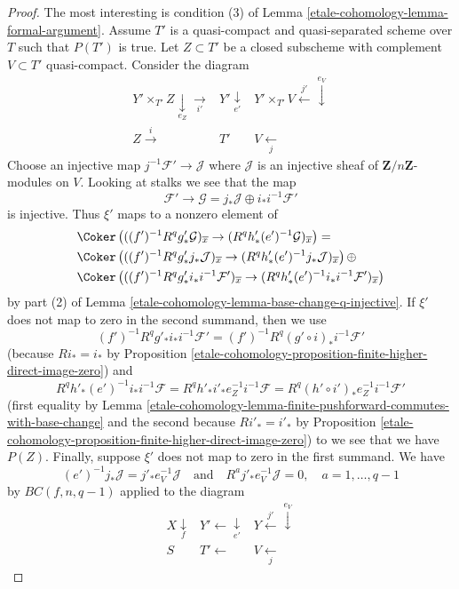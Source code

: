 \begin{proof}
\medskip\noindent
The most interesting is condition (3) of Lemma \ref{etale-cohomology-lemma-formal-argument}.
Assume $T'$ is a quasi-compact and quasi-separated scheme over $T$
such that $P(T')$ is true.
Let $Z \subset T'$ be a closed subscheme with complement $V \subset T'$
quasi-compact. Consider the diagram
$$
\begin{array}{ccc}Y' \times_{T'} Z \underset{e_Z}{\downarrow}\underset{i'}{\longrightarrow} & Y' \underset{e'}{\downarrow} & Y' \times_{T'} V \overset{j'}{\longleftarrow}\overset{e_V}{\downarrow} \\ Z \overset{i}{\longrightarrow} & T' & V \underset{j}{\longleftarrow}\end{array}
$$
Choose an injective map $j^{-1}\mathcal{F}' \to \mathcal{J}$
where $\mathcal{J}$ is an injective sheaf of $\mathbf{Z}/n\mathbf{Z}$-modules
on $V$. Looking at stalks we see that the map
$$
\mathcal{F}' \to \mathcal{G} = j_*\mathcal{J} \oplus i_*i^{-1}\mathcal{F}'
$$
is injective. Thus $\xi'$ maps to a nonzero element of
\begin{align*}
& \Coker\left(
((f')^{-1}R^qg'_*\mathcal{G})_{\overline{x}}
\to
(R^qh'_*(e')^{-1}\mathcal{G})_{\overline{x}}
\right) = \\
&
\Coker\left(
((f')^{-1}R^qg'_*j_*\mathcal{J})_{\overline{x}}
\to
(R^qh'_*(e')^{-1}j_*\mathcal{J})_{\overline{x}}
\right) \oplus \\
& \Coker\left(
((f')^{-1}R^qg'_*i_*i^{-1}\mathcal{F}')_{\overline{x}}
\to
(R^qh'_*(e')^{-1}i_*i^{-1}\mathcal{F}')_{\overline{x}}
\right)
\end{align*}
by part (2) of Lemma \ref{etale-cohomology-lemma-base-change-q-injective}.
If $\xi'$ does not map to zero in the second summand, then
we use
$$
(f')^{-1}R^qg'_*i_*i^{-1}\mathcal{F}' =
(f')^{-1}R^q(g' \circ i)_*i^{-1}\mathcal{F}'
$$
(because $Ri_* = i_*$ by
Proposition \ref{etale-cohomology-proposition-finite-higher-direct-image-zero}) and
$$
R^qh'_*(e')^{-1}i_*i^{-1}\mathcal{F} =
R^qh'_*i'_*e_Z^{-1}i^{-1}\mathcal{F} =
R^q(h' \circ i')_*e_Z^{-1}i^{-1}\mathcal{F}'
$$
(first equality by
Lemma \ref{etale-cohomology-lemma-finite-pushforward-commutes-with-base-change}
and the second because
$Ri'_* = i'_*$ by
Proposition \ref{etale-cohomology-proposition-finite-higher-direct-image-zero})
to we see that we have $P(Z)$.
Finally, suppose $\xi'$ does not map to zero in the first summand.
We have
$$
(e')^{-1}j_*\mathcal{J} = j'_*e_V^{-1}\mathcal{J}
\quad\text{and}\quad
R^aj'_*e_V^{-1}\mathcal{J} = 0, \quad a = 1, \ldots, q - 1
$$
by $BC(f, n, q - 1)$ applied to the diagram
$$
\begin{array}{ccc}X \underset{f}{\downarrow} & Y' \longleftarrow\underset{e'}{\downarrow} & Y \overset{j'}{\longleftarrow}\overset{e_V}{\downarrow} \\ S & T' \longleftarrow & V \underset{j}{\longleftarrow}\end{array}
$$
\end{proof}
